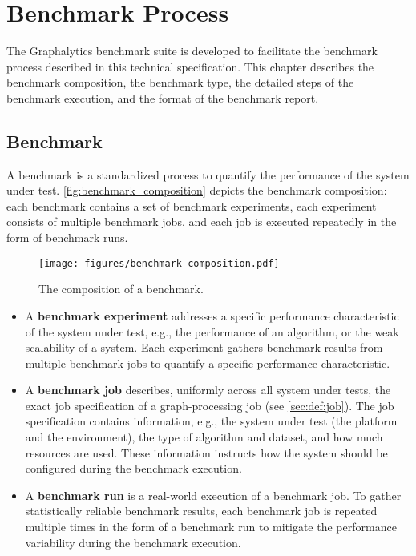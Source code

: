 \chapter{Benchmark Process}
\label{chap:benchmark_process}
The Graphalytics benchmark suite is developed to facilitate the benchmark process described in this technical specification. This chapter describes the benchmark composition, the benchmark type, the detailed steps of the benchmark execution, and the format of the benchmark report. 


\section{Benchmark}
\label{sec:process:benchmark}
A benchmark is a standardized process to quantify the performance of the system under test. \autoref{fig:benchmark_composition} depicts the benchmark composition: each benchmark contains a set of benchmark experiments, each experiment consists of multiple benchmark jobs, and each job is executed repeatedly in the form of benchmark runs.

\begin{figure}[h]
	\centering
	\texttt{[image: figures/benchmark-composition.pdf]}
	\caption{The composition of a benchmark.}
	\label{fig:benchmark_composition}
\end{figure}

\begin{itemize}
    \item A \textbf{benchmark experiment} addresses a specific performance characteristic of the system under test, e.g., the performance of an algorithm, or the weak scalability of a system. Each experiment gathers benchmark results from multiple benchmark jobs to quantify a specific performance characteristic.
    
    \item A \textbf{benchmark job} describes, uniformly across all system under tests, the exact job specification of a graph-processing job (see \autoref{sec:def:job}). The job specification contains information, e.g., the system under test (the platform and the environment), the type of algorithm and dataset, and how much resources are used. These information instructs how the system should be configured during the benchmark execution.
    
    \item A \textbf{benchmark run} is a real-world execution of a benchmark job. To gather statistically reliable benchmark results, each benchmark job is repeated multiple times in the form of a benchmark run to mitigate the performance variability during the benchmark execution. 
\end{itemize}




